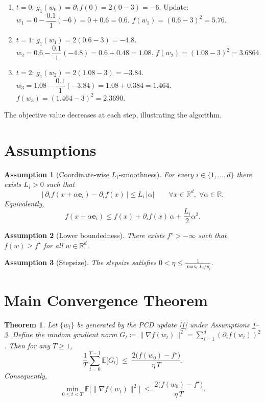 \documentclass{article}
\newtheorem{theorem}{Theorem}
\newtheorem{assumption}{Assumption}
\newcommand{\E}{\mathbb{E}}
\newcommand{\R}{\mathbb{R}}
\newcommand{\grad}{\nabla}
\newcommand{\be}{\mathbf e}
\begin{document}
\begin{enumerate}[label=Iteration \arabic*:, leftmargin=*]
\item $t=0$:  
    $g_{1}(w_{0})=\partial_{1}f(0)=2(0-3)=-6$.  
    Update: $w_{1}=0-\dfrac{0.1}{1}(-6)=0+0.6=0.6$.  
    $f(w_{1})=(0.6-3)^{2}=5.76$.

\item $t=1$:  
    $g_{1}(w_{1})=2(0.6-3)=-4.8$.  
    $w_{2}=0.6-\dfrac{0.1}{1}(-4.8)=0.6+0.48=1.08$.  
    $f(w_{2})=(1.08-3)^{2}=3.6864$.

\item $t=2$:  
    $g_{1}(w_{2})=2(1.08-3)=-3.84$.  
    $w_{3}=1.08-\dfrac{0.1}{1}(-3.84)=1.08+0.384=1.464$.  
    $f(w_{3})=(1.464-3)^{2}=2.3690$.
\end{enumerate}
The objective value decreases at each step, illustrating the algorithm.

\newpage
\section*{Assumptions}
\begin{assumption}[Coordinate‑wise $L_{i}$‑smoothness]\label{ass:smooth}
For every $i\in\{1,\dots ,d\}$ there exists $L_{i}>0$ such that
\[
\bigl|\,\partial_{i}f(x+\alpha\be_{i})-\partial_{i}f(x)\,\bigr|
\le L_{i}\,|\alpha|\qquad\forall x\in\R^{d},\;\forall\alpha\in\R .
\tag{3}
\]
Equivalently,
\[
f(x+\alpha\be_{i})\le f(x)+\partial_{i}f(x)\,\alpha+\frac{L_{i}}{2}\alpha^{2}.
\tag{4}
\]
\end{assumption}
\begin{assumption}[Lower boundedness]\label{ass:lb}
There exists $f^{\star}>-\infty$ such that $f(w)\ge f^{\star}$ for all $w\in\R^{d}$.
\end{assumption}
\begin{assumption}[Stepsize]\label{ass:stepsize}
The stepsize satisfies $0<\eta\le \displaystyle\frac{1}{\max_{i}L_{i}/p_{i}}$.
\end{assumption}

\section*{Main Convergence Theorem}
\begin{theorem}\label{thm:main}
Let $\{w_{t}\}$ be generated by the PCD update \eqref{1} under
Assumptions \ref{ass:smooth}–\ref{ass:stepsize}.
Define the random gradient norm $G_{t}\coloneqq\|\grad f(w_{t})\|^{2}
=\sum_{i=1}^{d}(\partial_{i}f(w_{t}))^{2}$.
Then for any $T\ge1$,
\[
\frac{1}{T}\sum_{t=0}^{T-1}\E\!\bigl[G_{t}\bigr]
\;\le\;
\frac{2\bigl(f(w_{0})-f^{\star}\bigr)}{\eta\,T}.
\tag{5}
\]
Consequently,
\[
\min_{0\le t<T}\E\!\bigl[\|\grad f(w_{t})\|^{2}\bigr]
\;\le\;
\frac{2\bigl(f(w_{0})-f^{\star}\bigr)}{\eta\,T}.
\tag{6}
\]
\end{theorem}
\end{document}
